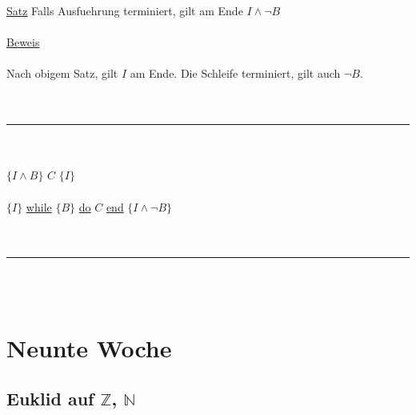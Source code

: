 \documentclass[18pt,a4paper]{article}
\begin{document}
\uline{Satz} Falls Ausfuehrung terminiert, gilt am Ende $I \wedge \neg B$\\
\\
\uline{Beweis}\\
\\
Nach obigem Satz, gilt $I$ am Ende. Die Schleife terminiert, gilt auch $\neg B$.\\
\\
\\
\rule{\textwidth}{0.4mm}\\
\\
$\{ I \wedge B \}$ $C$ $\{ I \}$\\
\\
$\{I \}$ \uline{while} $\{ B \} $ \uline{do} $C$ \uline{end} $\{ I \wedge \neg B \} $\\
\\
\\
\rule{\textwidth}{0.4mm}\\
\\

\section{Neunte Woche}

\subsection{Euklid auf $\mathbb{Z}$, $\mathbb{N}$}
\end{document}
